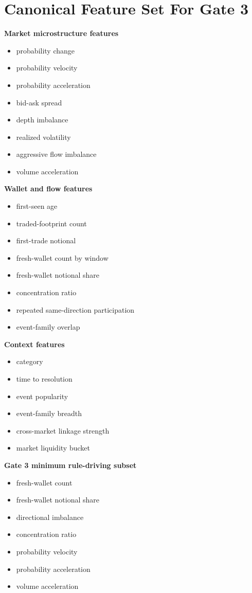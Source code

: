 \documentclass{article}
\begin{document}
\section*{Canonical Feature Set For Gate 3}
\textbf{Market microstructure features}
\begin{itemize}
\item probability change
\item probability velocity
\item probability acceleration
\item bid-ask spread
\item depth imbalance
\item realized volatility
\item aggressive flow imbalance
\item volume acceleration
\end{itemize}

\textbf{Wallet and flow features}
\begin{itemize}
\item first-seen age
\item traded-footprint count
\item first-trade notional
\item fresh-wallet count by window
\item fresh-wallet notional share
\item concentration ratio
\item repeated same-direction participation
\item event-family overlap
\end{itemize}

\textbf{Context features}
\begin{itemize}
\item category
\item time to resolution
\item event popularity
\item event-family breadth
\item cross-market linkage strength
\item market liquidity bucket
\end{itemize}

\textbf{Gate 3 minimum rule-driving subset}
\begin{itemize}
\item fresh-wallet count
\item fresh-wallet notional share
\item directional imbalance
\item concentration ratio
\item probability velocity
\item probability acceleration
\item volume acceleration
\end{itemize}
\end{document}
